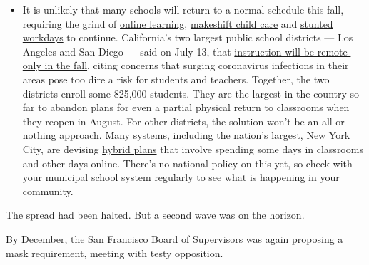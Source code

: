 \begin{itemize}
  \begin{itemize}
  \tightlist
  \item
    It is unlikely that many schools will return to a normal schedule
    this fall, requiring the grind of
    \href{https://www.nytimes.com/2020/06/05/us/coronavirus-education-lost-learning.html?action=click\&pgtype=Article\&state=default\&region=MAIN_CONTENT_3\&context=storylines_faq}{online
    learning},
    \href{https://www.nytimes.com/2020/05/29/us/coronavirus-child-care-centers.html?action=click\&pgtype=Article\&state=default\&region=MAIN_CONTENT_3\&context=storylines_faq}{makeshift
    child care} and
    \href{https://www.nytimes.com/2020/06/03/business/economy/coronavirus-working-women.html?action=click\&pgtype=Article\&state=default\&region=MAIN_CONTENT_3\&context=storylines_faq}{stunted
    workdays} to continue. California's two largest public school
    districts --- Los Angeles and San Diego --- said on July 13, that
    \href{https://www.nytimes.com/2020/07/13/us/lausd-san-diego-school-reopening.html?action=click\&pgtype=Article\&state=default\&region=MAIN_CONTENT_3\&context=storylines_faq}{instruction
    will be remote-only in the fall}, citing concerns that surging
    coronavirus infections in their areas pose too dire a risk for
    students and teachers. Together, the two districts enroll some
    825,000 students. They are the largest in the country so far to
    abandon plans for even a partial physical return to classrooms when
    they reopen in August. For other districts, the solution won't be an
    all-or-nothing approach.
    \href{https://bioethics.jhu.edu/research-and-outreach/projects/eschool-initiative/school-policy-tracker/}{Many
    systems}, including the nation's largest, New York City, are
    devising
    \href{https://www.nytimes.com/2020/06/26/us/coronavirus-schools-reopen-fall.html?action=click\&pgtype=Article\&state=default\&region=MAIN_CONTENT_3\&context=storylines_faq}{hybrid
    plans} that involve spending some days in classrooms and other days
    online. There's no national policy on this yet, so check with your
    municipal school system regularly to see what is happening in your
    community.
  \end{itemize}
\end{itemize}

The spread had been halted. But a second wave was on the horizon.

By December, the San Francisco Board of Supervisors was again proposing
a mask requirement, meeting with testy opposition.

